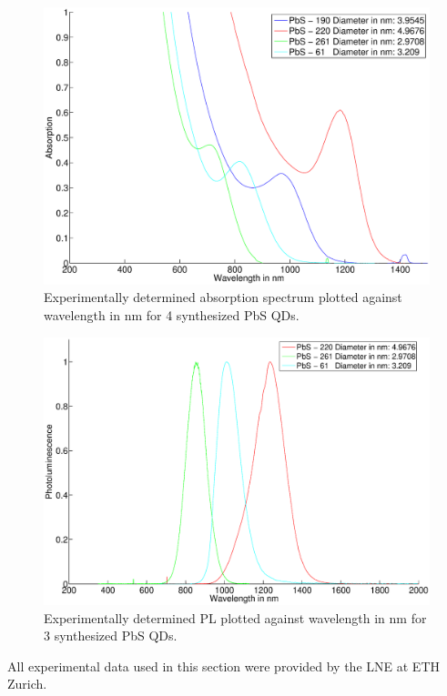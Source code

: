 	\begin{figure}[htpb]
		\includegraphics[width=\textwidth]{Fig/Plots/Abs_PbS.eps}
		\caption{Experimentally determined absorption spectrum plotted against wavelength in nm for 4 synthesized PbS \glspl{QD}.}
		\label{fig:Abs_PbS}
	\end{figure}
	
	\begin{figure}
		\includegraphics[width=\textwidth]{Fig/Plots/PL_PbS.eps}
		\caption{Experimentally determined \gls{PL} plotted against wavelength in nm for 3 synthesized PbS \glspl{QD}.}
		\label{fig:PL_PbS}
	\end{figure}
		
	\begin{REMARK}
		All experimental data used in this section were provided by the \gls{LNE} at ETH Zurich.
	\end{REMARK}

